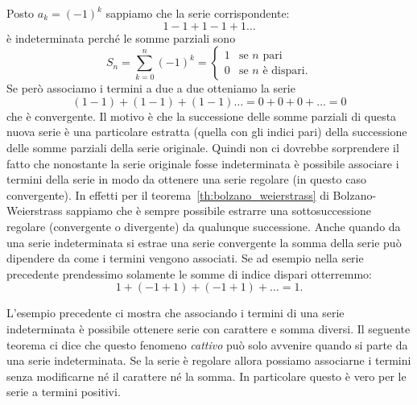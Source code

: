 \begin{example}
Posto $a_k = (-1)^k$ sappiamo che la serie corrispondente:
\[
  1 - 1 + 1 - 1 + 1 \dots
\]
è indeterminata perché le somme parziali sono
\[
  S_n = \sum_{k=0}^n (-1)^k
  = \begin{cases}
   1 & \text{se $n$ pari}\\
   0 & \text{se $n$ è dispari.}
  \end{cases}
\]
Se però associamo i termini a due a due otteniamo la serie
\[
  (1-1) + (1-1) + (1-1) \dots = 0 + 0 + 0 + \dots = 0
\]
che è convergente.
Il motivo è che la successione delle somme
parziali di questa nuova serie è una particolare estratta (quella
con gli indici pari) della successione delle somme parziali della
serie originale. Quindi non ci dovrebbe sorprendere il fatto che
nonostante la serie originale fosse indeterminata è possibile
associare i termini della serie in modo da ottenere una serie
regolare (in questo caso convergente).
In effetti per il teorema~\ref{th:bolzano_weierstrass} 
di Bolzano-Weierstrass sappiamo che
è sempre possibile estrarre una sottosuccessione regolare (convergente o divergente)
da qualunque successione.
Anche quando da una serie indeterminata si estrae una serie
convergente la somma della serie può dipendere da come i termini
vengono associati.
Se ad esempio nella serie precedente prendessimo
solamente le somme di indice dispari
otterremmo:
\[
  1 + (-1+1) + (-1+1) + \dots = 1.
\]
\end{example}

L'esempio precedente ci mostra che associando i termini di una
serie indeterminata è possibile ottenere serie con carattere
e somma diversi.
Il seguente teorema ci dice che questo fenomeno \emph{cattivo}
può solo avvenire quando si parte da una serie indeterminata.
Se la serie è regolare allora possiamo associarne i termini
senza modificarne né il carattere né la somma.
In particolare questo è vero per le serie a termini positivi.

